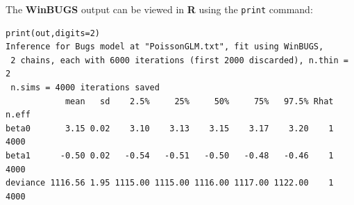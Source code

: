 
{\flushleft The} {\bf WinBUGS} output can be viewed in {\bf R} using the {\tt print} command:
{\small
\begin{verbatim}
print(out,digits=2)
Inference for Bugs model at "PoissonGLM.txt", fit using WinBUGS,
 2 chains, each with 6000 iterations (first 2000 discarded), n.thin = 2
 n.sims = 4000 iterations saved
            mean   sd    2.5%     25%     50%     75%   97.5% Rhat n.eff
beta0       3.15 0.02    3.10    3.13    3.15    3.17    3.20    1  4000
beta1      -0.50 0.02   -0.54   -0.51   -0.50   -0.48   -0.46    1  4000
deviance 1116.56 1.95 1115.00 1115.00 1116.00 1117.00 1122.00    1  4000
\end{verbatim}
}



